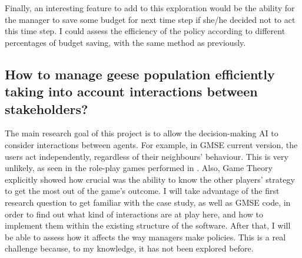 \documentclass[12pt,a4paper]{article}
\begin{document}
Finally, an interesting feature to add to this exploration would be the ability for the manager to save some budget for next time step if she/he decided not to act this time step.
I could assess the efficiency of the policy according to different percentages of budget saving, with the same method as previously.

%
%

\subsection{How to manage geese population efficiently taking into account interactions between stakeholders?}

The main research goal of this project is to allow the decision-making AI to consider interactions between agents.
For example, in GMSE current version, the users act independently, regardless of their neighbours' behaviour.
This is very unlikely, as seen in the role-play games performed in \cite{redpath2018games}.
Also, Game Theory explicitly showed how crucial was the ability to know the other players' strategy to get the most out of the game's outcome.
I will take advantage of the first research question to get familiar with the case study, as well as GMSE code, in order to find out what kind of interactions are at play here, and how to implement them within the existing structure of the software.
After that, I will be able to assess how it affects the way managers make policies.
This is a real challenge because, to my knowledge, it has not been explored before.
\end{document}
